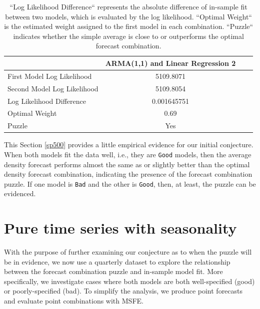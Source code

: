 \documentclass{monashthesis}
\begin{document}
\begin{table}[ht]
  \centering
    \begin{tabular}{l|ccc}
    \toprule
                                      &   ARMA(1,1) and Linear Regression 2   \\  
    \midrule
    First Model Log Likelihood        &               5109.8071               \\
    Second Model Log Likelihood       &               5109.8054               \\
    Log Likelihood Difference         &              0.001645751              \\
    Optimal Weight                    &                0.69                   \\
    Puzzle                            &                 Yes                   \\
    \bottomrule
    \end{tabular}
  \caption{``Log Likelihood Difference`` represents the absolute difference of in-sample fit between two models, which is evaluated by the log likelihood. ``Optimal Weight`` is the estimated weight assigned to the first model in each combination. ``Puzzle`` indicates whether the simple average is close to or outperforms the optimal forecast combination.}
  \label{tab:statfit}
\end{table}

This Section \ref{sp500} provides a little empirical evidence for our initial conjecture. When both models fit the data well, i.e., they are \texttt{Good} models, then the average density forecast performs almost the same as or slightly better than the optimal density forecast combination, indicating the presence of the forecast combination puzzle. If one model is \texttt{Bad} and the other is \texttt{Good}, then, at least, the puzzle can be evidenced.

\hypertarget{pure-time-series-with-seasonality}{%
\section{Pure time series with seasonality}\label{pure-time-series-with-seasonality}}

With the purpose of further examining our conjecture as to when the puzzle will be in evidence, we now use a quarterly dataset to explore the relationship between the forecast combination puzzle and in-sample model fit. More specifically, we investigate cases where both models are both well-specified (good) or poorly-specified (bad). To simplify the analysis, we produce point forecasts and evaluate point combinations with MSFE.
\end{document}

